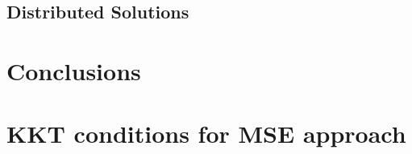 \documentclass[10pt,final,twocolumn,letterpaper]{./../Styles/IEEEtran}
\begin{document}
\subsection{Distributed Solutions}


\acresetall
\section{Conclusions} \label{sec-6}


\appendices

%

\section{\ac{KKT} conditions for \ac{MSE} approach} \label{a-1}




\end{document}
